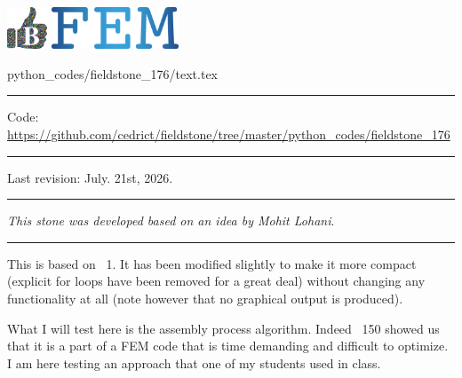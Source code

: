\noindent
\includegraphics[height=1.25cm]{images/pictograms/benchmark}
\includegraphics[height=1.25cm]{images/pictograms/FEM}


\begin{flushright} {\tiny {\color{gray} python\_codes/fieldstone\_176/text.tex}} \end{flushright}

%

\par\noindent\rule{\textwidth}{0.4pt}

\begin{center}
\inpython
{\small Code: \url{https://github.com/cedrict/fieldstone/tree/master/python_codes/fieldstone_176}}
\end{center}

\par\noindent\rule{\textwidth}{0.4pt}

Last revision: July. 21st, 2026.

\par\noindent\rule{\textwidth}{0.4pt}

{\sl This stone was developed based on an idea by Mohit Lohani}. 

\par\noindent\rule{\textwidth}{0.4pt}


This \stone is based on \stone~1. It has been modified slightly to make it more compact
(explicit for loops have been removed for a great deal) without
changing any functionality at all (note however that no graphical output is produced).

What I will test here is the assembly process algorithm. Indeed \stone~150 showed us that 
it is a part of a FEM code that is time demanding and difficult to optimize. 
I am here testing an approach that one of my students used in class.

